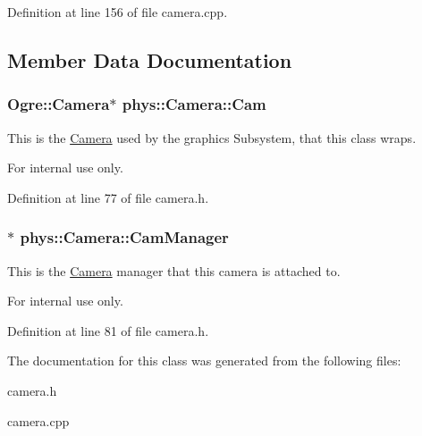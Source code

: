 Definition at line 156 of file camera.cpp.



\subsection{Member Data Documentation}
\hypertarget{classphys_1_1Camera_a91622148b9b9a9ae1554c828f7e2fc89}{
\subsubsection[{Cam}]{\setlength{\rightskip}{0pt plus 5cm}Ogre::Camera$\ast$ {\bf phys::Camera::Cam}}}
\label{d9/df8/classphys_1_1Camera_a91622148b9b9a9ae1554c828f7e2fc89}


This is the \hyperlink{classphys_1_1Camera}{Camera} used by the graphics Subsystem, that this class wraps. 

\begin{DoxyInternal}{For internal use only.}
\end{DoxyInternal}


Definition at line 77 of file camera.h.

\hypertarget{classphys_1_1Camera_a909203ede748deb1b587a8758ba8cec4}{
\subsubsection[{CamManager}]{$\ast$ {\bf phys::Camera::CamManager}}}
\label{d9/df8/classphys_1_1Camera_a909203ede748deb1b587a8758ba8cec4}


This is the \hyperlink{classphys_1_1Camera}{Camera} manager that this camera is attached to. 

\begin{DoxyInternal}{For internal use only.}
\end{DoxyInternal}


Definition at line 81 of file camera.h.



The documentation for this class was generated from the following files:\begin{DoxyCompactItemize}
\item 
camera.h\item 
camera.cpp\end{DoxyCompactItemize}
